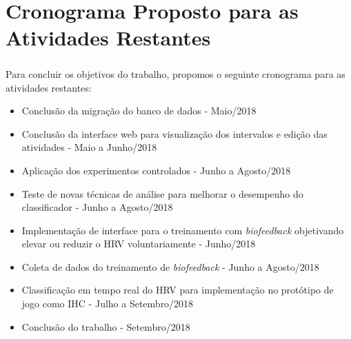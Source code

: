
\chapter{Cronograma Proposto para as Atividades Restantes} %

\label{AppendixA} %

\paragraph{} Para concluir os objetivos do trabalho, propomos o seguinte cronograma para as atividades restantes:

\begin{itemize}
    \item Conclusão da migração do banco de dados - Maio/2018
    \item Conclusão da interface web para visualização dos intervalos e edição das atividades - Maio a Junho/2018
    \item Aplicação dos experimentos controlados - Junho a Agosto/2018
    \item Teste de novas técnicas de análise para melhorar o desempenho do classificador - Junho a Agosto/2018
    \item Implementação de interface para o treinamento com \textit{biofeedback} objetivando elevar ou reduzir o HRV voluntariamente - Junho/2018
    \item Coleta de dados do treinamento de \textit{biofeedback} - Junho a Agosto/2018
    \item Classificação em tempo real do HRV para implementação no protótipo de jogo como IHC - Julho a Setembro/2018
    \item Conclusão do trabalho - Setembro/2018
\end{itemize}